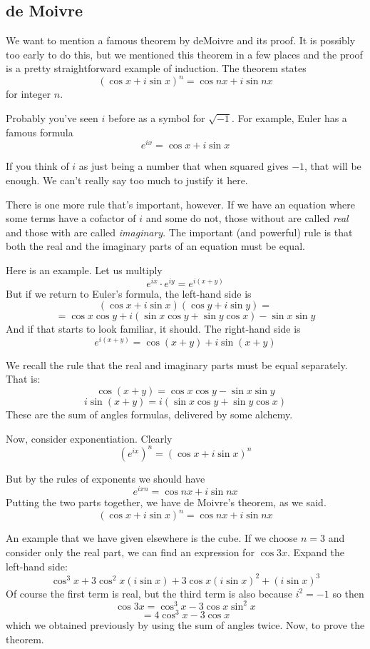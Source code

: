 \documentclass[11pt, oneside]{article}
\begin{document}
\subsection*{de Moivre}
\label{sec:de_Moivre_theorem}

We want to mention a famous theorem by deMoivre and its proof.  It is possibly too early to do this, but we mentioned this theorem in a few places and the proof is a pretty straightforward example of induction.  The theorem states
\[ (\cos x + i \sin x)^n = \cos nx + i \sin nx \]
for integer $n$.

Probably you've seen $i$ before as a symbol for $\sqrt{-1}$.  For example, Euler has a famous formula
\[ e^{ix} = \cos x + i \sin x \]

If you think of $i$ as just being a number that when squared gives $-1$, that will be enough.  We can't really say too much to justify it here.  

There is one more rule that's important, however.  If we have an equation where some terms have a cofactor of $i$ and some do not, those without are called \emph{real} and those with are called \emph{imaginary}.  The important (and powerful) rule is that both the real and the imaginary parts of an equation must be equal.

Here is an example.  Let us multiply
\[ e^{ix} \cdot e^{iy} = e^{i(x+y)} \]
But if we return to Euler's formula, the left-hand side is
\[ (\cos x + i \sin x)(\cos y + i \sin y) = \]
\[ =  \cos x \cos y + i(\sin x \cos y + \sin y \cos x) - \sin x \sin y \]
And if that starts to look familiar, it should.  The right-hand side is
\[ e^{i(x+y)} = \cos (x+y) + i \sin (x+y) \]

We recall the rule that the real and imaginary parts must be equal separately.  That is:
\[ \cos (x+y) = \cos x \cos y - \sin x \sin y \]
\[ i \sin(x+y) =  i(\sin x \cos y + \sin y \cos x) \]
These are the sum of angles formulas, delivered by some alchemy.

Now, consider exponentiation.  Clearly
\[ (e^{ix})^n = (\cos x + i \sin x)^n \]

But by the rules of exponents we should have
\[ e^{ixn} = \cos nx + i \sin nx \]
Putting the two parts together, we have de Moivre's theorem, as we said.
\[ (\cos x + i \sin x)^n = \cos nx + i \sin nx \]

An example that we have given elsewhere is the cube.  If we choose $n = 3$ and consider only the real part, we can find an expression for $\cos 3x$.  Expand the left-hand side:
\[ \cos^3 x + 3 \cos^2 x (i \sin x) + 3 \cos x (i \sin x)^2 + (i \sin x)^3 \]
Of course the first term is real, but the third term is also because $i^2 = -1$ so then
\[ \cos 3x  = \cos^3 x - 3 \cos x \sin^2 x \]
\[ = 4 \cos^3 x - 3 \cos x \]
which we obtained previously by using the sum of angles twice.  Now, to prove the theorem.
\end{document}
